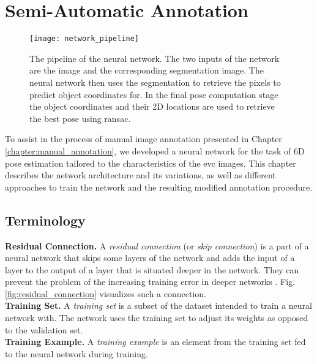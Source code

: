 \chapter{Semi-Automatic Annotation} \label{chapter:semi_automatic}

\begin{figure}[!tbp]
	\centering
    \texttt{[image: network\_pipeline]}
    \caption{The pipeline of the neural network. The two inputs of the network are the image and the corresponding segmentation image. The neural network then uses the segmentation to retrieve the pixels to predict object coordinates for. In the final pose computation stage the object coordinates and their 2D locations are used to retrieve the best pose using \ac{ransac}.}
    	\label{fig:network_pipeline}
\end{figure} 

To assist in the process of manual image annotation presented in Chapter \ref{chapter:manual_annotation}, we developed a neural network for the task of 6D pose estimation tailored to the characteristics of the \ac{evc} images. This chapter describes the network architecture and its variations, as well as different approaches to train the network and the resulting modified annotation procedure.

\section{Terminology} \label{section:network_terminology}

\noindent\textbf{Residual Connection.} A \textit{residual connection} (or \textit{skip connection}) is a part of a neural network that skips some layers of the network and adds the input of a layer to the output of a layer that is situated deeper in the network. They can prevent the problem of the increasing training error in deeper networks \cite{resnet}. Fig. \ref{fig:residual_connection} visualizes such a connection. \\

\noindent\textbf{Training Set.} A \textit{training set} is a subset of the dataset intended to train a neural network with. The network uses the training set to adjust its weights as opposed to the validation set. \\

\noindent\textbf{Training Example.} A \textit{training example} is an element from the training set fed to the neural network during training. \\

